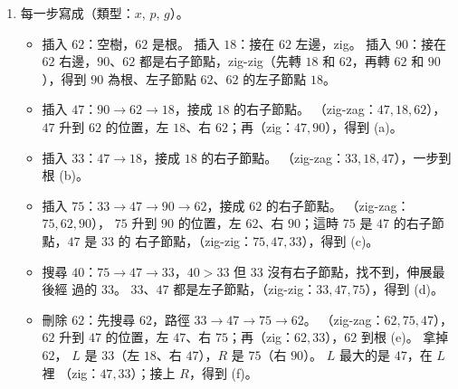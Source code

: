 \begin{enumerate}
\item 每一步寫成（類型：$x$, $p$, $g$）。
\begin{itemize}
\item 插入 $62$：空樹，$62$ 是根。 插入 $18$：接在 $62$ 左邊，zig。 插入 $90$：接在 $62$
右邊，$90$、$62$ 都是右子節點，zig-zig（先轉 $18$ 和 $62$，再轉 $62$ 和 $90$），得到
$90$ 為根、左子節點 $62$、$62$ 的左子節點 $18$。
\item 插入 $47$：$90 \to 62 \to 18$，接成 $18$ 的右子節點。 （zig-zag：$47, 18, 62$），
$47$ 升到 $62$ 的位置，左 $18$、右 $62$；再（zig：$47, 90$），得到 (a)。
\item 插入 $33$：$47 \to 18$，接成 $18$ 的右子節點。 （zig-zag：$33, 18, 47$），一步到根 (b)。
\item 插入 $75$：$33 \to 47 \to 90 \to 62$，接成 $62$ 的右子節點。 （zig-zag：$75, 62, 90$），
$75$ 升到 $90$ 的位置，左 $62$、右 $90$；這時 $75$ 是 $47$ 的右子節點，$47$ 是 $33$ 的
右子節點，（zig-zig：$75, 47, 33$），得到 (c)。
\item 搜尋 $40$：$75 \to 47 \to 33$，$40 > 33$ 但 $33$ 沒有右子節點，找不到，伸展最後經
過的 $33$。 $33$、$47$ 都是左子節點，（zig-zig：$33, 47, 75$），得到 (d)。
\item 刪除 $62$：先搜尋 $62$，路徑 $33 \to 47 \to 75 \to 62$。 （zig-zag：$62, 75, 47$），
$62$ 升到 $47$ 的位置，左 $47$、右 $75$；再（zig：$62, 33$），$62$ 到根 (e)。 拿掉 $62$，
$L$ 是 $33$（左 $18$、右 $47$），$R$ 是 $75$（右 $90$）。 $L$ 最大的是 $47$，在 $L$ 裡
（zig：$47, 33$）；接上 $R$，得到 (f)。
\end{itemize}
\begin{center}
\hspace{0.5cm}
\end{center}
\end{enumerate}
